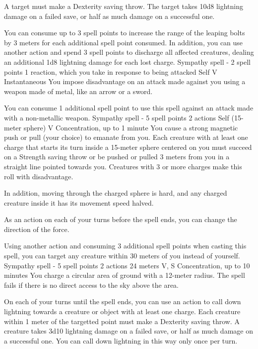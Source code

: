         A target must make a Dexterity saving throw.
        The target takes 10d8 lightning damage on a failed save, or half as much damage on a successful one.

        You can consume up to 3 spell points to increase the range of the leaping bolts by 3 meters for each additional spell point consumed.
        In addition, you can use another action and spend 3 spell points to discharge all affected creatures, dealing an additional 1d8 lightning damage for each lost charge.
        {Sympathy spell - 2 spell points}
        {1 reaction, which you take in response to being attacked}
        {Self}
        {V}
        {Instantaneous}
        You impose disadvantage on an attack made against you using a weapon made of metal, like an arrow or a sword.

        You can consume 1 additional spell point to use this spell against an attack made with a non-metallic weapon.
        {Sympathy spell - 5 spell points}
        {2 actions}
        {Self (15-meter sphere)}
        {V}
        {Concentration, up to 1 minute}
        You cause a strong magnetic push or pull (your choice) to emanate from you.
        Each creature with at least one charge that starts its turn inside a 15-meter sphere centered on you must succeed on a Strength saving throw or be pushed or pulled 3 meters from you in a straight line pointed towards you.
        Creatures with 3 or more charges make this roll with disadvantage.

        In addition, moving through the charged sphere is hard, and any charged creature inside it has its movement speed halved.

        As an action on each of your turns before the spell ends, you can change the direction of the force.

        Using another action and consuming 3 additional spell points when casting this spell, you can target any creature within 30 meters of you instead of yourself.
        {Sympathy spell - 5 spell points}
        {2 actions}
        {24 meters}
        {V, S}
        {Concentration, up to 10 minutes}
        You charge a circular area of ground with a 12-meter radius.
        The spell fails if there is no direct access to the sky above the area.

        On each of your turns until the spell ends, you can use an action to call down lightning towards a creature or object with at least one charge.
        Each creature within 1 meter of the targetted point must make a Dexterity saving throw.
        A creature takes 3d10 lightning damage on a failed save, or half as much damage on a successful one.
        You can call down lightning in this way only once per turn.

